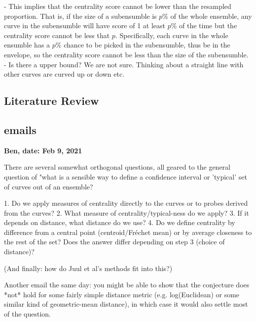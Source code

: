 \documentclass[12pt]{article}
\theoremstyle{definition} %
\begin{document}
- This implies that the centrality score cannot be lower than the resampled proportion. 
That is, if the size of a subensumble is $p\%$ of the whole ensemble, any curve in the subensumble will have score of 1 at least $p\%$ of the time but the centrality score cannot be less that $p$. Specifically, each curve in the whole ensumble has a $p\%$ chance to be picked in the subensumble, thus be in the envelope, so the centrality score cannot be less than the size of the subensumble.     
- Is there a upper bound? We are not sure. Thinking about a straight line with other curves are curved up or down etc.
\subsection{Literature Review}
\citep{juul2021fixed}

\subsection{emails}

{\bf Ben,  
date: Feb 9, 2021}

There are several somewhat orthogonal questions, all geared to the general question of "what is a sensible way to define a confidence interval or 'typical' set of curves out of an ensemble?

 1. Do we apply measures of centrality directly to the curves or to
probes derived from the curves?
 2.  What measure of centrality/typical-ness do we apply?
 3.  If it depends on distance, what distance do we use?
 4. Do we define centrality by difference from a central point
(centroid/Fréchet mean) or by average closeness to the rest of the
set? Does the answer differ depending on step 3 (choice of distance)?

(And finally: how do Juul et al's methods fit into this?)

Another email the same day:
you might be able to show that the conjecture does *not* hold for some fairly simple distance metric (e.g. log(Euclidean) or some similar kind of geometric-mean distance), in which case it would also settle most of the question.
\end{document}
